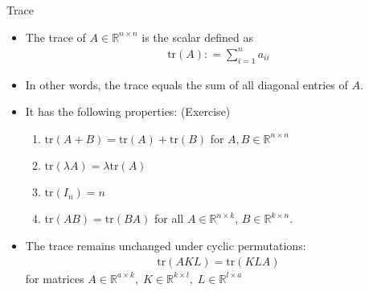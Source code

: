 \begin{frame}{Trace}
\begin{itemize}
    \item The trace of $A\in \mathbb{R}^{n\times n}$ is the scalar defined as 
    \begin{align}
        \text{tr}(A): = \sum_{i=1}^n a_{ii}
    \end{align}
    \item In other words, the trace equals the sum of all diagonal entries of $A$.
    \item It has the following properties: (Exercise)
    \begin{enumerate}
        \item $\text{tr}(A+B) = \text{tr}(A) + \text{tr}(B)$ for $A, B\in \mathbb{R}^{n\times n}$
        \item $\text{tr}(\lambda A ) = \lambda \text{tr}(A)$
        \item $\text{tr}(I_n) = n$
        \item $\text{tr}(AB) = \text{tr}(BA)$ for all $A\in \mathbb{R}^{n\times k }$, $B\in \mathbb{R}^{k\times n}$.
        \end{enumerate}
     \item The trace remains unchanged under cyclic permutations:
    \begin{align}
        \text{tr}(AKL) = \text{tr}(KLA)
    \end{align}
    for matrices $A\in \mathbb{R}^{a\times k}, \; K \in \mathbb{R}^{k\times l}, \; L \in \mathbb{R}^{l\times a} $
\end{itemize}
\end{frame}
